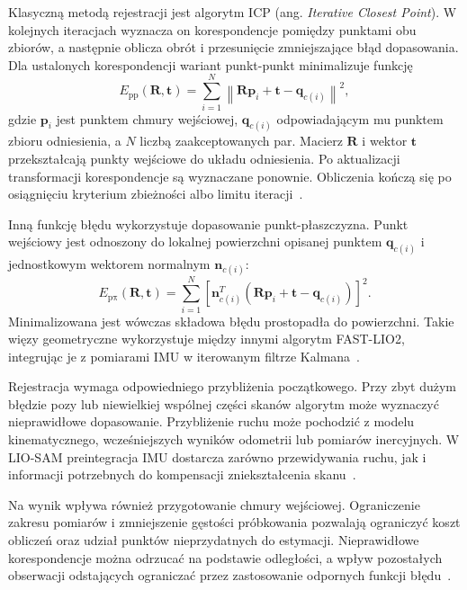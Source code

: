 \documentclass[a4paper,twoside,12pt]{book}
\begin{document}
Klasyczną metodą rejestracji jest algorytm ICP (ang. \textit{Iterative Closest Point}). W kolejnych iteracjach wyznacza on korespondencje pomiędzy punktami obu zbiorów, a następnie oblicza obrót i przesunięcie zmniejszające błąd dopasowania. Dla ustalonych korespondencji wariant punkt-punkt minimalizuje funkcję
\begin{equation}
    E_{\mathrm{pp}}(\mathbf{R},\mathbf{t}) =
    \sum_{i=1}^{N}
    \left\|
        \mathbf{R}\mathbf{p}_i + \mathbf{t}
        - \mathbf{q}_{c(i)}
    \right\|^{2},
    \label{eq:slam-icp-punkt-punkt}
\end{equation}
gdzie $\mathbf{p}_i$ jest punktem chmury wejściowej, $\mathbf{q}_{c(i)}$ odpowiadającym mu punktem zbioru odniesienia, a $N$ liczbą zaakceptowanych par. Macierz $\mathbf{R}$ i wektor $\mathbf{t}$ przekształcają punkty wejściowe do układu odniesienia. Po aktualizacji transformacji korespondencje są wyznaczane ponownie. Obliczenia kończą się po osiągnięciu kryterium zbieżności albo limitu iteracji~\cite{rb34_besl1992}.

Inną funkcję błędu wykorzystuje dopasowanie punkt-płaszczyzna. Punkt wejściowy jest odnoszony do lokalnej powierzchni opisanej punktem $\mathbf{q}_{c(i)}$ i jednostkowym wektorem normalnym $\mathbf{n}_{c(i)}$:
\begin{equation}
    E_{\mathrm{p\pi}}(\mathbf{R},\mathbf{t}) =
    \sum_{i=1}^{N}
    \left[
        \mathbf{n}_{c(i)}^{T}
        \left(
            \mathbf{R}\mathbf{p}_i + \mathbf{t}
            - \mathbf{q}_{c(i)}
        \right)
    \right]^{2}.
    \label{eq:slam-icp-punkt-plaszczyzna}
\end{equation}
Minimalizowana jest wówczas składowa błędu prostopadła do powierzchni. Takie więzy geometryczne wykorzystuje między innymi algorytm FAST-LIO2, integrując je z pomiarami IMU w iterowanym filtrze Kalmana~\cite{lidar_inertial_odometry_tight_coupled}.

Rejestracja wymaga odpowiedniego przybliżenia początkowego. Przy zbyt dużym błędzie pozy lub niewielkiej wspólnej części skanów algorytm może wyznaczyć nieprawidłowe dopasowanie. Przybliżenie ruchu może pochodzić z modelu kinematycznego, wcześniejszych wyników odometrii lub pomiarów inercyjnych. W LIO-SAM preintegracja IMU dostarcza zarówno przewidywania ruchu, jak i informacji potrzebnych do kompensacji zniekształcenia skanu~\cite{9341176}.

Na wynik wpływa również przygotowanie chmury wejściowej. Ograniczenie zakresu pomiarów i zmniejszenie gęstości próbkowania pozwalają ograniczyć koszt obliczeń oraz udział punktów nieprzydatnych do estymacji. Nieprawidłowe korespondencje można odrzucać na podstawie odległości, a wpływ pozostałych obserwacji odstających ograniczać przez zastosowanie odpornych funkcji błędu~\cite{blanco2025mola_lo}.
\end{document}

